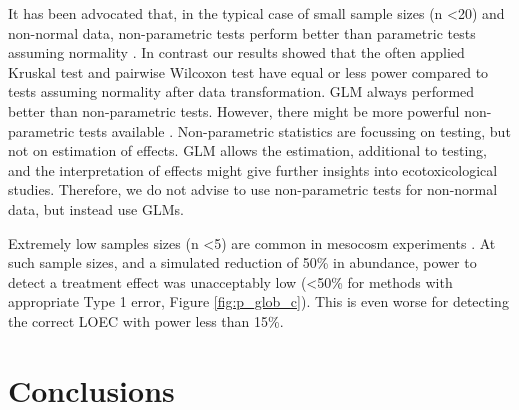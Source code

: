\documentclass{scrartcl}
\begin{document}
It has been advocated that, in the typical case of small sample sizes (n \textless 20) and non-normal data, non-parametric tests perform better than parametric tests assuming normality \citep{wang_making_2011}.
In contrast our results showed that the often applied Kruskal test and pairwise Wilcoxon test have equal or less power compared to tests assuming normality after data transformation.
GLM always performed better than non-parametric tests. 
However, there might be more powerful non-parametric tests available \citep{konietschke_rank-based_2012}.
Non-parametric statistics are focussing on testing, but not on estimation of effects.
GLM allows the estimation, additional to testing, and the interpretation of effects might give further insights into ecotoxicological studies.
Therefore, we do not advise to use non-parametric tests for non-normal data, but instead use GLMs.

Extremely low samples sizes (n \textless 5) are common in mesocosm experiments \citep{sanderson_pesticide_2002,szocs_analysing_2015}.
At such sample sizes, and a simulated reduction of 50\% in abundance, power to detect a treatment effect was unacceptably low (\textless 50\% for methods with appropriate Type 1 error, Figure \ref{fig:p_glob_c}).
This is even worse for detecting the correct LOEC with power less than 15\%.








\section{Conclusions}




\end{document}
